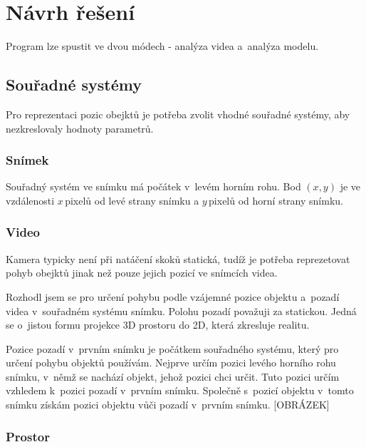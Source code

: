\chapter{Návrh řešení}

Program lze spustit ve dvou módech - analýza videa a~analýza modelu.




\section{Souřadné systémy}
\label{sec:ssystemy}

Pro reprezentaci pozic obejktů je potřeba zvolit vhodné souřadné systémy, aby nezkreslovaly hodnoty parametrů.



\subsection{Snímek}

Souřadný systém ve snímku má počátek v~levém horním rohu. Bod $(x,y)$ je ve vzdálenosti $x$\,\rm pixelů od levé strany snímku a $y$\,\rm pixelů od horní strany snímku.



\subsection{Video}

Kamera typicky není při natáčení skoků statická, tudíž je potřeba reprezetovat pohyb obejktů jinak než pouze jejich pozicí ve snímcích videa.

Rozhodl jsem se pro určení pohybu podle vzájemné pozice objektu a~pozadí videa v~souřadném systému snímku. Polohu pozadí považuji za statickou. Jedná se o~jistou formu projekce 3D prostoru do 2D, která zkresluje realitu.

Pozice pozadí v~prvním snímku je počátkem souřadného systému, který pro určení pohybu objektů používám. Nejprve určím pozici levého horního rohu snímku, v~němž se nachází objekt, jehož pozici chci určit. Tuto pozici určím vzhledem k~pozici pozadí v~prvním snímku. Společně s~pozicí objektu v~tomto snímku získám pozici objektu vůči pozadí v~prvním snímku. [OBRÁZEK]



\subsection{Prostor}

